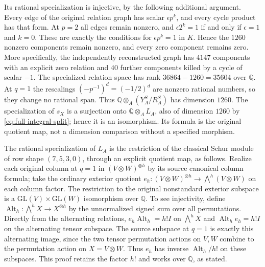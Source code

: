Its rational specialization is injective, by the following
additional argument. Every edge of the original relation
graph has scalar $\epsilon p^k$, and every cycle product
has that form. At $p=2$ all edges remain nonzero, and
$\epsilon 2^k=1$ if and only if $\epsilon=1$ and $k=0$.
These are exactly the conditions for $\epsilon p^k=1$ in
$K$. Hence the $1260$ nonzero components remain nonzero,
and every zero component remains zero. More specifically,
the independently reconstructed graph has $4147$ components
with an explicit zero relation and $40$ further components
killed by a cycle of scalar $-1$. The specialized relation
space has rank $36864-1260=35604$ over $\mathbb Q$.
At $q=1$ the rescalings $(-p^{-1})^d=(-1/2)^d$ are
nonzero rational numbers, so they change no rational span.
Thus $\mathbb Q\otimes_A(Y_A^S/R_A^S)$ has dimension
$1260$. The specialization of $s_X$ is a surjection onto
$\mathbb Q\otimes_A L_A$, also of dimension $1260$ by
\eqref{eq:full-integral-split}; hence it is an isomorphism.
Its formula is the original quotient map, not a dimension
comparison without a specified morphism.

The rational specialization of $L_A$ is the restriction of
the classical Schur module of row shape $(7,5,3,0)$, through
an explicit quotient map, as follows. Realize each original
column at $q=1$ in $(V\otimes W)^{\otimes h}$ by its source
canonical column formula; take the ordinary exterior quotient
$e_h:(V\otimes W)^{\otimes h}\to\bigwedge^h(V\otimes W)$
on each column factor. The restriction to the original
nonstandard exterior subspace is a $\mathrm{GL}(V)\times
\mathrm{GL}(W)$ isomorphism over $\mathbb Q$. To see
injectivity, define $\operatorname{Alt}_h:
\bigwedge^hX\to X^{\otimes h}$ by the unnormalized signed
sum over all permutations. Directly from the alternating
relations, $e_h\operatorname{Alt}_h=h!I$ on $\bigwedge^hX$
and $\operatorname{Alt}_he_h=h!I$ on the alternating
tensor subspace. The source subspace at $q=1$ is exactly
this alternating image, since the two tensor permutation
actions on $V,W$ combine to the permutation action on
$X=V\otimes W$. Thus $e_h$ has inverse
$\operatorname{Alt}_h/h!$ on these subspaces. This proof retains
the factor $h!$ and works over $\mathbb Q$, as stated.

